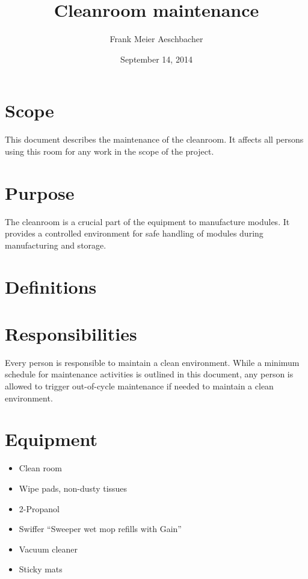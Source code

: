 \documentclass[12pt]{unlsilabsop}
\title{Cleanroom maintenance}
\date{September 14, 2014}
\author{Frank Meier Aeschbacher}
\begin{document}
\maketitle

\section{Scope}
This document describes the maintenance of the cleanroom. It affects all persons using this room for any work in the scope of the project.

\section{Purpose}
The cleanroom is a crucial part of the equipment to manufacture modules. It provides a controlled environment for safe handling of modules during manufacturing and storage.

\section{Definitions}

\section{Responsibilities}
Every person is responsible to maintain a clean environment. While a minimum schedule for maintenance activities is outlined in this document, any person is allowed to trigger out-of-cycle maintenance if needed to maintain a clean environment.

\section{Equipment}

\begin{itemize}
    \item Clean room
    \item Wipe pads, non-dusty tissues
    \item 2-Propanol
    \item Swiffer ``Sweeper wet mop refills with Gain''
    \item Vacuum cleaner
    \item Sticky mats
\end{itemize}
\end{document}
